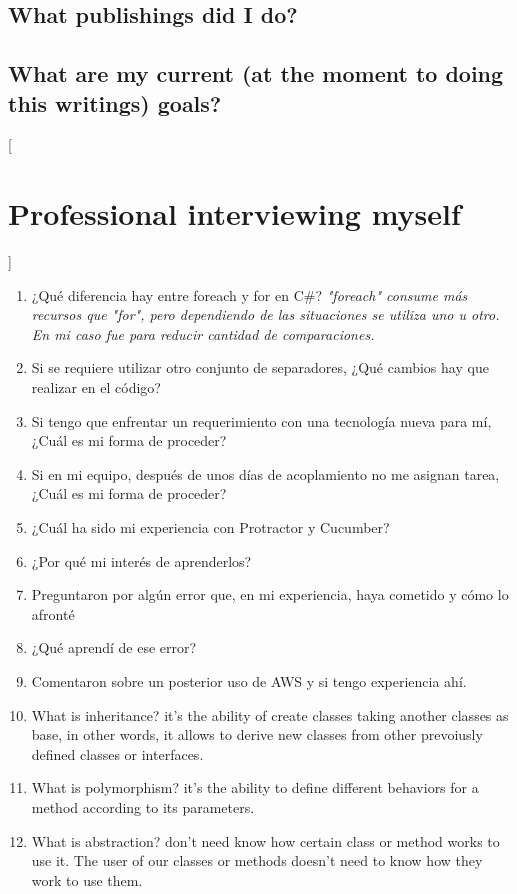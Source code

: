 \subsection{What publishings did I do?}

\subsection{What are my current (at the moment to doing this writings) goals?}

[\section{Professional interviewing myself}]
\begin{multicols}{2}
\begin{enumerate}
\item ¿Qué diferencia hay entre foreach y for en C\#? \emph{"foreach" consume más recursos que "for", pero dependiendo de las situaciones se utiliza uno u otro. En mi caso fue para reducir cantidad de comparaciones.}
\item Si se requiere utilizar otro conjunto de separadores, ¿Qué cambios hay que realizar en el código?
\item Si tengo que enfrentar un requerimiento con una tecnología nueva para mí, ¿Cuál es mi forma de proceder?
\item Si en mi equipo, después de unos días de acoplamiento no me asignan tarea, ¿Cuál es mi forma de proceder?
\item ¿Cuál ha sido mi experiencia con Protractor y Cucumber?
\item ¿Por qué mi interés de aprenderlos?
\item Preguntaron por algún error que, en mi experiencia, haya cometido y cómo lo afronté
\item ¿Qué aprendí de ese error?
\item Comentaron sobre un posterior uso de AWS y si tengo experiencia ahí.
\item What is inheritance? it's the ability of create classes taking another classes as base, in other words, it allows to derive new classes from other prevoiusly defined classes or interfaces.
\item What is polymorphism? it's the ability to define different behaviors for a method according to its parameters. 
\item What is abstraction? don't need know how certain class or method works to use it. The user of our classes or methods doesn't need to know how they work to use them.

\end{enumerate}
\end{multicols}
